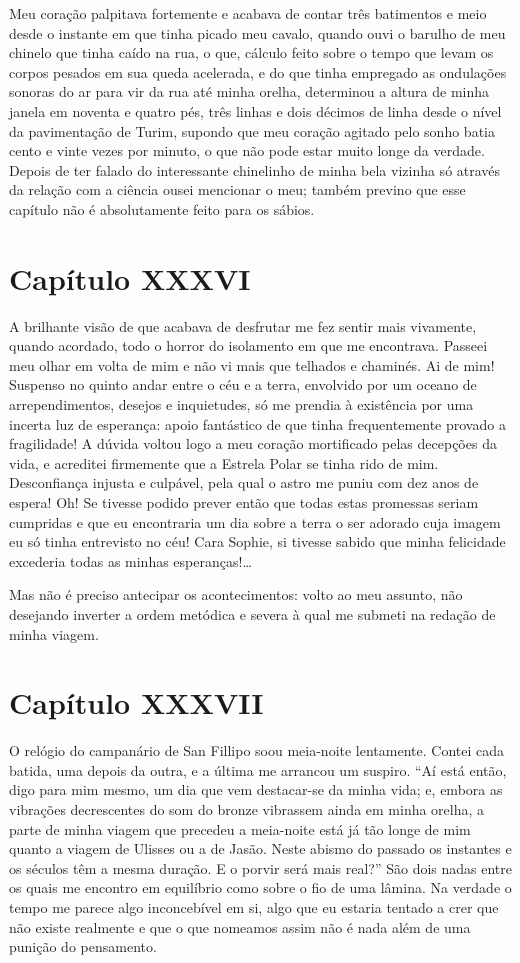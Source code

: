  Meu coração palpitava fortemente e acabava de contar três batimentos e
meio desde o instante em que tinha picado meu cavalo, quando ouvi o
barulho de meu chinelo que tinha caído na rua, o que, cálculo feito
sobre o tempo que levam os corpos pesados em sua queda acelerada, e do
que tinha empregado as ondulações sonoras do ar para vir da rua até
minha orelha, determinou a altura de minha janela em noventa e quatro
pés, três linhas e dois décimos de linha desde o nível da pavimentação
de Turim, supondo que meu coração agitado pelo sonho batia cento e
vinte vezes por minuto, o que não pode estar muito longe da verdade.
Depois de ter falado do interessante chinelinho de minha bela vizinha
só através da relação com a ciência ousei mencionar o meu; também
previno que esse capítulo não é absolutamente feito para os sábios.

\section{Capítulo XXXVI}

 A brilhante visão de que acabava de desfrutar me fez sentir mais
vivamente, quando acordado, todo o horror do isolamento em que me
encontrava. Passeei meu olhar em volta de mim e não vi mais que
telhados e chaminés. Ai de mim! Suspenso no quinto andar entre o céu e
a terra, envolvido por um oceano de arrependimentos, desejos e
inquietudes, só me prendia à existência por uma incerta luz de
esperança: apoio fantástico de que tinha frequentemente provado a
fragilidade! A dúvida voltou logo a meu coração mortificado pelas
decepções da vida, e acreditei firmemente que a Estrela Polar se tinha
rido de mim. Desconfiança injusta e culpável, pela qual o astro me
puniu com dez anos de espera! Oh! Se tivesse podido prever então que
todas estas promessas seriam cumpridas e que eu encontraria um dia
sobre a terra o ser adorado cuja imagem eu só tinha entrevisto no céu!
Cara Sophie, si tivesse sabido que minha felicidade excederia todas as
minhas esperanças!\ldots

 Mas não é preciso antecipar os acontecimentos: volto ao meu assunto,
não desejando inverter a ordem metódica e severa à qual me submeti na
redação de minha viagem.

\section{Capítulo XXXVII}

 O relógio do campanário de San Fillipo soou meia-noite lentamente.
Contei cada batida, uma depois da outra, e a última me arrancou um
suspiro. ``Aí está então, digo para mim mesmo, um dia que vem
destacar-se da minha vida; e, embora as vibrações decrescentes do som
do bronze vibrassem ainda em minha orelha, a parte de minha viagem que
precedeu a meia-noite está já tão longe de mim quanto a viagem de
Ulisses ou a de Jasão. Neste abismo do passado os instantes e os
séculos têm a mesma duração. E o porvir será mais real?'' São dois nadas
entre os quais me encontro em equilíbrio como sobre o fio de uma
lâmina. Na verdade o tempo me parece algo inconcebível em si, algo que
eu estaria tentado a crer que não existe realmente e que o que nomeamos
assim não é nada além de uma punição do pensamento.  

